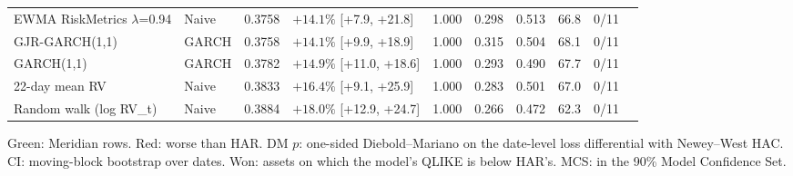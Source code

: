 \begin{table}[!htbp]
\begin{tabularx}{\linewidth}{>{\raggedright\arraybackslash}X l r l r r r r r c}
\rowcolor{bad}EWMA RiskMetrics $\lambda$=0.94 & Naive & 0.3758 & $+14.1\%$ [+7.9, +21.8] & 1.000 & 0.298 & 0.513 & 66.8 & 0/11 &  \\
\rowcolor{bad}GJR-GARCH(1,1) & GARCH & 0.3758 & $+14.1\%$ [+9.9, +18.9] & 1.000 & 0.315 & 0.504 & 68.1 & 0/11 &  \\
\rowcolor{bad}GARCH(1,1) & GARCH & 0.3782 & $+14.9\%$ [+11.0, +18.6] & 1.000 & 0.293 & 0.490 & 67.7 & 0/11 &  \\
\rowcolor{bad}22-day mean RV & Naive & 0.3833 & $+16.4\%$ [+9.1, +25.9] & 1.000 & 0.283 & 0.501 & 67.0 & 0/11 &  \\
\rowcolor{bad}Random walk (log RV\_t) & Naive & 0.3884 & $+18.0\%$ [+12.9, +24.7] & 1.000 & 0.266 & 0.472 & 62.3 & 0/11 &  \\
\bottomrule
\end{tabularx}
\par\smallskip\begin{minipage}{\linewidth}\scriptsize Green: Meridian rows. Red: worse than HAR. DM $p$: one-sided Diebold--Mariano on the date-level loss differential with Newey--West HAC. CI: moving-block bootstrap over dates. Won: assets on which the model's QLIKE is below HAR's. MCS: in the 90\% Model Confidence Set.\end{minipage}
\end{table}
